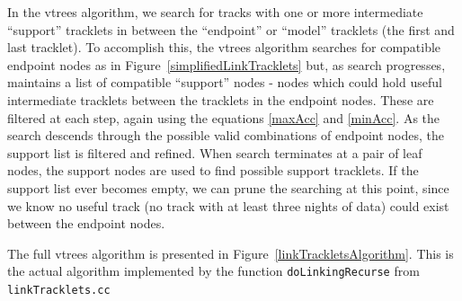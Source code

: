 In the vtrees algorithm, we search for tracks with one or more
intermediate ``support'' tracklets in between the ``endpoint'' or
``model'' tracklets (the first and last tracklet).  To accomplish
this, the vtrees algorithm searches for compatible endpoint nodes as
in Figure~\ref{simplifiedLinkTracklets} but, as search progresses, maintains
a list of compatible ``support'' nodes - nodes which could hold useful
intermediate tracklets between the tracklets in the endpoint nodes.
These are filtered at each step, again using the equations
\ref{maxAcc} and \ref{minAcc}.  As the search descends through the
possible valid combinations of endpoint nodes, the support list is
filtered and refined.  When search terminates at a pair of leaf nodes,
the support nodes are used to find possible support tracklets.  If the
support list ever becomes empty, we can prune the searching at this
point, since we know no useful track (no track with at least three
nights of data) could exist between the endpoint
nodes.

The full vtrees algorithm is presented in
Figure~\ref{linkTrackletsAlgorithm}.  This is the actual algorithm
implemented by the function {\tt doLinkingRecurse} from {\tt linkTracklets.cc}



